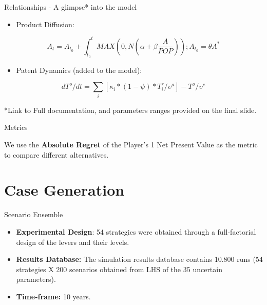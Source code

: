 \documentclass[12pt,ignorenonframetext,]{beamer}
\providecommand{\tightlist}{%
  \setlength{\itemsep}{0pt}\setlength{\parskip}{0pt}}
\begin{document}
\begin{frame}{Relationships - A glimpse* into the model}
\protect\hypertarget{relationships---a-glimpse-into-the-model}{}

\begin{itemize}
\tightlist
\item
  Product Diffusion:
\end{itemize}

\[ A_t = A_{t_0} + \int_{t_0}^{t}  MAX\left(0,N \left(\alpha + \beta \frac{A}{POP}\right)\right); A_{t_0} = \theta A^*\]

\begin{itemize}
\tightlist
\item
  Patent Dynamics (added to the model):
\end{itemize}

\[dT^o/dt = \sum_{i}{[\kappa_i * (1-\psi) * T_i^r / \upsilon^a]}   - T^o/ \upsilon^e \]

*Link to Full documentation, and parameters ranges provided on the final
slide.

\end{frame}

\begin{frame}{Metrics}
\protect\hypertarget{metrics}{}

We use the \textbf{Absolute Regret} of the Player's 1 Net Present Value
as the metric to compare different alternatives.

\end{frame}

\hypertarget{case-generation}{%
\section{Case Generation}\label{case-generation}}

\begin{frame}{Scenario Ensemble}
\protect\hypertarget{scenario-ensemble}{}

\begin{itemize}
\tightlist
\item
  \textbf{Experimental Design}: 54 strategies were obtained through a
  full-factorial design of the levers and their levels.
\item
  \textbf{Results Database:} The simulation results database contains
  10.800 runs (54 strategies X 200 scenarios obtained from LHS of the 35
  uncertain parameters).
\item
  \textbf{Time-frame:} 10 years.
\end{itemize}

\end{frame}
\end{document}
